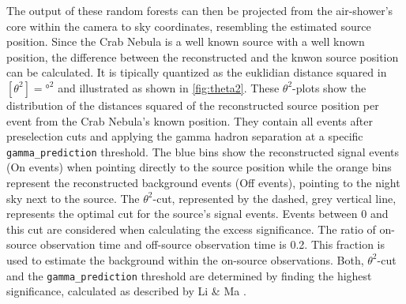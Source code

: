 The output of these random forests can then be projected from the air-shower's
core within the camera to sky coordinates, resembling the estimated source
position. Since the Crab Nebula is a well known source with a well known
position, the difference between the reconstructed and the knwon source
position can be calculated. It is tipically quantized as the euklidian distance
squared in $[\theta^2] = \si{\degree\squared}$ and illustrated as shown in
\autoref{fig:theta2}. These $\theta^2$-plots show the distribution of the
distances squared of the reconstructed source position per event from the Crab
Nebula's known position. They contain all events after preselection cuts and
applying the gamma hadron separation at a specific \texttt{gamma\_prediction}
threshold. The blue bins show the reconstructed signal events (On events) when
pointing directly to the source position while the orange bins represent the
reconstructed background events (Off events), pointing to the night sky next to
the source. The $\theta^2$-cut, represented by the dashed, grey vertical line,
represents the optimal cut for the source's signal events. Events between
\num{0} and this cut are considered when calculating the excess significance.
The ratio of on-source observation time and off-source observation time is
\num{0.2}. This fraction is used to estimate the background within the
on-source observations. Both, $\theta^2$-cut and the \texttt{gamma\_prediction}
threshold are determined by finding the highest significance, calculated as
described by Li \& Ma \cite{LiMa}.


